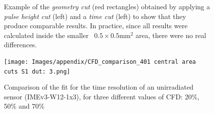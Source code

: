 \begin{figure}[h!tbp]
    \centering
    \hfill
    \centering
    \caption{Example of the \textit{geometry cut} (red rectangles) obtained by applying a \textit{pulse height cut} (left) and a \textit{time cut} (left) to show that they produce comparable results. In practice, since all results were calculated inside the smaller \ \(0.5\times0.5\unit{\milli\meter^2}\) area, there were no real differences.}
    \label{fig:geometry_cut_comparison}
\end{figure}


\begin{figure}[h!tbp]
    \centering
    \texttt{[image: Images/appendix/CFD\_comparison\_401 central area cuts S1 dut: 3.png]}
    \caption{Comparison of the fit for the time resolution of an unirradiated sensor (IMEv3-W12-1x3), for three different values of CFD: 20\%, 50\% and 70\%}
    \label{fig:CFD_comparison_unirradiated}
\end{figure}

